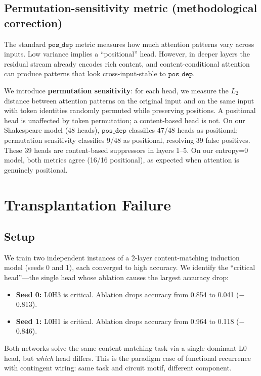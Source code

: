 \documentclass[final]{article}
\begin{document}
\subsection{Permutation-sensitivity metric (methodological correction)}
\label{sec:permtest}

The standard $\mathtt{pos\_dep}$ metric measures how much attention patterns
vary across inputs. Low variance implies a ``positional'' head. However, in
deeper layers the residual stream already encodes rich content, and
content-conditional attention can produce patterns that look cross-input-stable
to $\mathtt{pos\_dep}$.

We introduce \textbf{permutation sensitivity}: for each head, we measure the
$L_2$ distance between attention patterns on the original input and on the same
input with token identities randomly permuted while preserving positions. A
positional head is unaffected by token permutation; a content-based head is
not. On our Shakespeare model (48 heads), $\mathtt{pos\_dep}$ classifies 47/48
heads as positional; permutation sensitivity classifies 9/48 as positional,
resolving 39 false positives. These 39 heads are content-based suppressors in
layers 1--5. On our entropy=0 model, both metrics agree (16/16 positional), as
expected when attention is genuinely positional.

\section{Transplantation Failure}
\label{sec:transplant}

\subsection{Setup}

We train two independent instances of a 2-layer content-matching induction
model (seeds 0 and 1), each converged to high accuracy. We identify the
``critical head''---the single head whose ablation causes the largest accuracy
drop:
\begin{itemize}
\item \textbf{Seed 0:} L0H3 is critical. Ablation drops accuracy from 0.854 to
      0.041 ($-$0.813).
\item \textbf{Seed 1:} L0H1 is critical. Ablation drops accuracy from 0.964 to
      0.118 ($-$0.846).
\end{itemize}
Both networks solve the same content-matching task via a single dominant L0
head, but \emph{which} head differs. This is the paradigm case of functional
recurrence with contingent wiring: same task and circuit motif, different
component.
\end{document}
